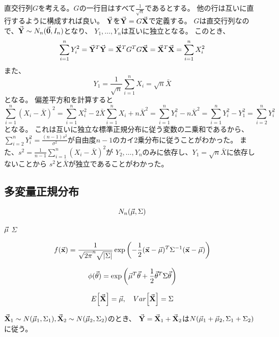 直交行列\(G\)を考える。\(G\)の一行目はすべて\(\frac{1}{\sqrt{n}}\)であるとする。
他の行は互いに直行するように構成すれば良い。
\(\va{Y}\)を\(\va{Y} = G\va{X}\)で定義する。
\(G\)は直交行列なので、\(\va{Y} \sim N_n(\va{0}, I_n) \)となり、
\(Y_1, \dots, Y_n\)は互いに独立となる。
このとき、
\begin{equation}
  \sum_{i=1}^{n} Y_i^2 = \va{Y}^{T} \va{Y}
  = \va{X}^T G^{T} G \va{X} = \va{X}^{T} \va{X} = \sum_{i=1}^{n} X_i^2
\end{equation}
また、
\begin{equation}
  Y_1 = \frac{1}{\sqrt{n}} \sum_{i=1}^{n} X_i = \sqrt{n}\bar{X}
\end{equation}
となる。
偏差平方和を計算すると
\begin{equation}
  \sum_{i=1}^{n} (X_i - \bar{X})^2 
  = \sum_{i=1}^{n} X_i^2 - 2 \bar{X} \sum_{i=1}^{n} X_i + n \bar{X}^2
  = \sum_{i=1}^{n} Y_i^2 - n \bar{X}^2
  = \sum_{i=1}^{n} Y_i^2 - Y_1^2
  = \sum_{i=2}^{n} Y_i^2
\end{equation}
となる。
これは互いに独立な標準正規分布に従う変数の二乗和であるから、
\(\sum_{i=2}^{n} Y_i^2 = \frac{(n - 1) s^2}{\sigma^2}\)が自由度\(n-1\)のカイ2乗分布に従うことがわかった。
また、\(s^2 = \frac{1}{n - 1} \sum_{i=1}^{n} (X_i - \bar{X})^2\)が
\(Y_2, \dots, Y_n\)のみに依存し、\(Y_1 = \sqrt{n} \bar{X}\)に依存しないことから
\(s^2\)と\(\bar{X}\)が独立であることがわかった。

\subsection{多変量正規分布}

\begin{outline}[description]
  \1 [表記]
  \begin{equation}
    N_n(\va{\mu}, \Sigma)
  \end{equation}
  
  \1 [パラメータ]
  \2
  \2 [平均ベクトル] \(\va{\mu}\)
  \2 [共分散行列] \(\Sigma\)
  
  \1 [密度関数]
  \begin{equation}
    f (\va{x}) = \frac{1}{\sqrt{2\pi}^n \sqrt{|\Sigma|}} \exp \qty ( - \frac{1}{2} (\va{x} - \va{\mu})^{T} \Sigma^{-1} (\va{x} - \va{\mu}) )
  \end{equation}
  
  \1 [積率母関数]
  \begin{equation}
    \phi(\va{\theta}) = \exp \qty ( \va{\mu}^{T} \va{\theta} + \frac{1}{2} \va{\theta}^{T} \Sigma \va{\theta} )
  \end{equation}
  
  \1 [期待値・分散]
  \begin{equation}
    E \qty [\va{X}] = \va{\mu}, \quad Var \qty [ \va{X} ] = \Sigma
  \end{equation}
  
  \1 [再生性]
  \(\va{X}_1 \sim N(\va{\mu}_1, \Sigma_1), \va{X}_2 \sim N(\va{\mu}_2, \Sigma_2)\)のとき、
  \(\va{Y} = \va{X}_1 + \va{X}_2\)は\(N(\va{\mu}_1 + \va{\mu}_2, \Sigma_1 + \Sigma_2)\)に従う。
  
\end{outline}

